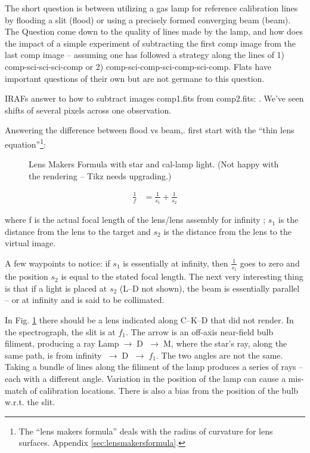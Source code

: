 \documentclass[letter,11pt,oneside]{article}
\newcommand{\menu}{\ensuremath{\;\rightarrow\;}}
\newcommand{\dhl}[1]{{\color{verbcolor}{\texttt#1}}}
\begin{document}
The short question is between utilizing a gas lamp for reference
calibration lines by flooding a slit (flood) or using a precisely
formed converging beam (beam). The Question come down to the quality
of lines made by the lamp, and how does the impact of a simple
experiment of subtracting the first comp image from the last comp
image -- assuming one has followed a strategy along the lines of 1)
comp-sci-sci-sci-comp or 2) comp-sci-comp-sci-comp-sci-comp. Flats
have important questions of their own but are not germane to this
question.



IRAFs answer to how to subtract images comp1.fits from comp2.fits:
\dhl{imarith comp1 - comp2 diff.fits}. We've seen shifts of several
pixels across one observation.


Answering the difference between flood vs beam,. first start with
the ``thin lens equation''\footnote{The ``lens makers formula'' deals with
the radius of curvature for lens surfaces. Appendix \ref{sec:lensmakersformula}.}:

\begin{figure}[h!]
\centering

\caption{Lens Makers Formula with star and cal-lamp light. (Not happy
with the rendering -- Tikz needs upgrading.)}
\label{fig:LMF}
\end{figure}


\begin{align}
\frac{1}{f} &= \frac{1}{s_{1}} +  \frac{1}{s_{2}} 
\end{align}

where f is the actual focal length of the lens/lens assembly for
infinity ; $s_{1}$ is the
distance from the lens to the target and $s_{2}$ is the distance from
the lens to the virtual image.


A few waypoints to
notice: if $s_{1}$ is essentially at infinity, then $\frac{1}{s_{1}}$
goes to zero and the position $s_{2}$ is equal to the stated focal
length. The next very interesting thing is that if a light is placed
at $s_{2}$ (L--D not shown), the beam is essentially parallel -- or at
infinity and is said to be collimated.

In Fig. \ref{fig:LMF} there should be a lens indicated along C--K--D
that did not render.  In the spectrograph, the slit is at $f_{1}$.
The arrow is an off-axis near-field bulb filiment, producing a ray
Lamp\menu D \menu M, where the star's ray, along the same path, is
from infinity \menu D \menu ${f_{1}}$. The two angles are not the
same. Taking a bundle of lines along the filiment of the lamp produces
a series of rays -- each with a different angle. Variation in the
position of the lamp can cause a mis-match of calibration
locations. There is also a bias from the position of the bulb
w.r.t. the slit.
\end{document}
